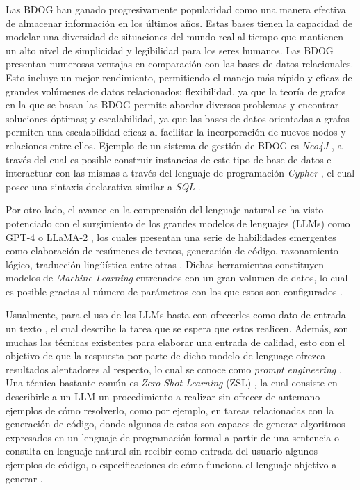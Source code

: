 Las BDOG han ganado progresivamente popularidad como una manera efectiva de almacenar información en los últimos años. Estas bases tienen la capacidad de modelar una diversidad de situaciones del mundo real al tiempo que mantienen un alto nivel de simplicidad y legibilidad para los seres humanos. Las BDOG presentan numerosas ventajas en comparación con las bases de datos relacionales. Esto incluye un mejor rendimiento, permitiendo el manejo más rápido y eficaz de grandes volúmenes de datos relacionados; flexibilidad, ya que la teoría de grafos en la que se basan las BDOG permite abordar diversos problemas y encontrar soluciones óptimas; y escalabilidad, ya que las bases de datos orientadas a grafos permiten una escalabilidad eficaz al facilitar la incorporación de nuevos nodos y relaciones entre ellos. Ejemplo de un sistema de gestión de BDOG es \textit{Neo4J} \cite{neo4j}, a través del cual es posible construir instancias de este tipo de base de datos e interactuar con las mismas a través del lenguaje de programación \textit{Cypher} \cite{cypher}, el cual posee una sintaxis declarativa similar a \textit{SQL} \cite{sqllang}.

Por otro lado, el avance en la comprensión del lenguaje natural se ha visto potenciado con el surgimiento de los grandes modelos de lenguajes (LLMs) \cite{llmsoverview} como GPT-4 \cite{gpt4} o LLaMA-2 \cite{llama2}, los cuales presentan una serie de habilidades emergentes como elaboración de resúmenes de textos, generación de código, razonamiento lógico, traducción lingüística entre otras \cite{llmsskills}. Dichas herramientas constituyen modelos de \textit{Machine Learning} entrenados con un gran volumen de datos, lo cual es posible gracias al número de parámetros con los que estos son configurados \cite{llmsoverview}. 

Usualmente, para el uso de los LLMs basta con ofrecerles como dato de entrada un texto \cite{llmsoverview}, el cual describe la tarea que se espera que estos realicen. Además, son muchas las técnicas existentes para elaborar una entrada de calidad, esto con el objetivo de que la respuesta por parte de dicho modelo de lenguage ofrezca resultados alentadores al respecto, lo cual se conoce como \textit{prompt engineering} \cite{promptengineering}. Una técnica bastante común es \textit{Zero-Shot Learning} (ZSL) \cite{zeroshotlearning}, la cual consiste en describirle a un LLM un procedimiento a realizar sin ofrecer de antemano ejemplos de cómo resolverlo, como por ejemplo, en tareas relacionadas con la generación de código, donde algunos de estos son capaces de generar algoritmos expresados en un lenguaje de programación formal a partir de una sentencia o consulta en lenguaje natural sin recibir como entrada del usuario algunos ejemplos de código, o especificaciones de cómo funciona el lenguaje objetivo a generar \cite{text2code1} \cite{text2code2}. 

